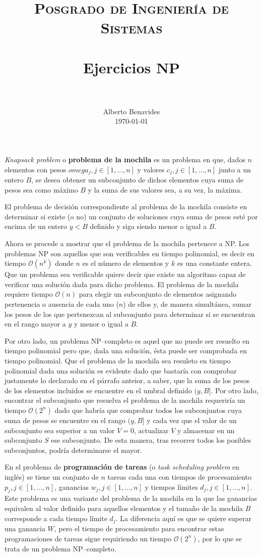 \documentclass[paper=leter, fontsize=11pt]{scrartcl}
\title{
		\usefont{OT1}{bch}{b}{n}
		\normalfont \normalsize \textsc{Posgrado de Ingeniería de Sistemas} \\ [25pt]
		\horrule{0.5pt} \\[0.4cm]
		\huge Ejercicios NP \\
		\horrule{2pt} \\[0.5cm]
}
\author{
		\normalfont 								\normalsize
        Alberto Benavides\\[-3pt]		\normalsize
        \today
}
\date{}
\numberwithin{equation}{section}		%
\numberwithin{figure}{section}			%
\numberwithin{table}{section}				%
\begin{document}
\maketitle
\textit{Knapsack problem} o \textbf{problema de la mochila} es un problema en que, dados $n$ elementos con pesos $omega_j, j \in [1, \ldots,  n]$ y valores $c_j, j \in [1, \ldots, n]$ junto a un entero $B$, se desea obtener un subconjunto de dichos elementos cuya suma de pesos sea como máximo $B$ y la suma de sus valores sea, a su vez, la máxima.

El problema de decisión correspondiente al problema de la mochila consiste en determinar si existe (o no) un conjunto de soluciones cuya suma de pesos esté por encima de un entero $y < B$ definido y siga siendo menor o igual a $B$.

Ahora se procede a mostrar que el problema de la mochila pertenece a NP. Los problemas NP son aquellos que son verificables en tiempo polinomial, es decir en tiempo $\mathcal{O}(n^k)$ donde $n$ es el número de elementos y $k$ es una constante entera. Que un problema sea verificable quiere decir que existe un algoritmo capaz de verificar una solución dada para dicho problema. El problema de la mochila requiere tiempo $\mathcal{O}(n)$ para elegir un subconjunto de elementos asignando pertenencia o ausencia de cada uno ($n$) de ellos y, de manera simultánea, sumar los pesos de los que pertenezcan al subconjunto para determinar si se encuentran en el rango mayor a $y$ y menor o igual a $B$.

Por otro lado, un problema NP--completo es aquel que no puede ser resuelto en tiempo polinomial pero que, dada una solución, ésta puede ser comprobada en tiempo polinomial. Que el problema de la mochila sea resuleto en tiempo polinomial dada una solución es evidente dado que bastaría con comprobar justamente lo declarado en el párrafo anteior, a saber, que la suma de los pesos de los elementos incluidos se encuentre en el umbral definido $(y, B]$. Por otro lado, encontrar el subconjunto que resuelva el problema de la mochila requeriría un tiempo $\mathcal{O}(2^n)$ dado que habría que comprobar todos los subconjuntos cuya suma de pesos se encuentre en el rango $(y, B]$ y cada vez que el valor de un subconjunto sea superior a un valor $V = 0$, actualizar $V$ y almacenar en un subconjunto $S$ ese subconjunto. De esta manera, tras recorrer todos los posibles subconjuntos, podría determinarse el mayor.

En el problema de \textbf{programación de tareas} (o \textit{task scheduling problem} en inglés) se tiene un conjunto de $n$ tareas cada una con tiempos de procesamiento $p_j, j \in [1, \ldots, n]$, ganancias $w_j, j \in [1, \ldots, n]$ y tiempos límites $d_j, j \in [1, \ldots, n]$. Este problema es una variante del problema de la mochila en la que las ganancias equivalen al valor definido para aquellos elementos y el tamaño de la mochila $B$ corresponde a cada tiempo límite $d_j$. La diferencia aquí es que se quiere superar una ganancia $W$, pero el tiempo de procesamiento para encontrar estas programaciones de tareas sigue requiriendo un tiempo $\mathcal{O}(2^n)$, por lo que se trata de un problema NP--completo.
\end{document}
